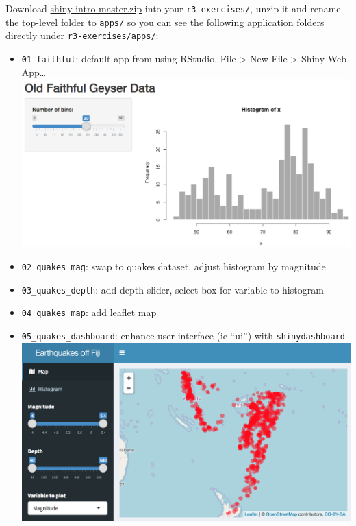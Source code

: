\documentclass[
  letterpaper,
  DIV=11,
  numbers=noendperiod]{scrreprt}
\providecommand{\tightlist}{%
  \setlength{\itemsep}{0pt}\setlength{\parskip}{0pt}}\usepackage{longtable,booktabs,array}
\begin{document}
Download
\href{https://github.com/bbest/shiny-intro/archive/master.zip}{shiny-intro-master.zip}
into your \texttt{r3-exercises/}, unzip it and rename the top-level
folder to \texttt{apps/} so you can see the following application
folders directly under \texttt{r3-exercises/apps/}:

\begin{itemize}
\tightlist
\item
  \texttt{01\_faithful}: default app from using RStudio, File
  \textgreater{} New File \textgreater{} Shiny Web App\ldots{}
  \includegraphics{./figs/shiny/screenshot-01_faithful.png}
\item
  \texttt{02\_quakes\_mag}: swap to quakes dataset, adjust histogram by
  magnitude
\item
  \texttt{03\_quakes\_depth}: add depth slider, select box for variable
  to histogram
\item
  \texttt{04\_quakes\_map}: add leaflet map
\item
  \texttt{05\_quakes\_dashboard}: enhance user interface (ie ``ui'')
  with \texttt{shinydashboard}
  \includegraphics{./figs/shiny/screenshot-05_quakes_dashboard.png}
\end{itemize}
\end{document}
